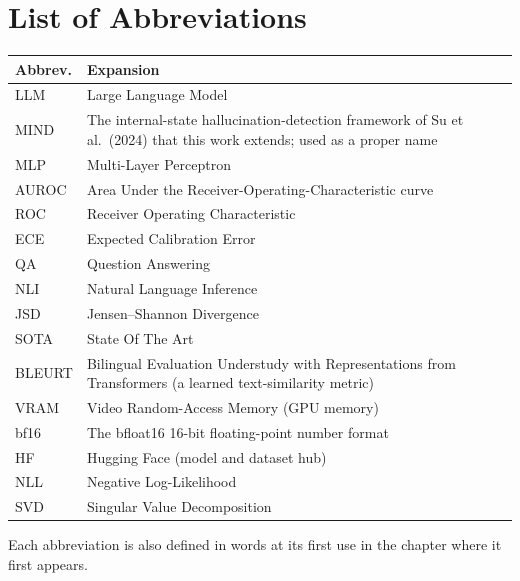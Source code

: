 \clearpage
\chapter*{List of Abbreviations}

\begin{center}
\renewcommand{\arraystretch}{1.25}
\begin{tabular}{p{2.6cm} p{10.5cm}}
\toprule
\textbf{Abbrev.} & \textbf{Expansion} \\
\midrule
LLM     & Large Language Model \\
MIND    & The internal-state hallucination-detection framework of Su et al.~(2024) that this work extends; used as a proper name \\
MLP     & Multi-Layer Perceptron \\
AUROC   & Area Under the Receiver-Operating-Characteristic curve \\
ROC     & Receiver Operating Characteristic \\
ECE     & Expected Calibration Error \\
QA      & Question Answering \\
NLI     & Natural Language Inference \\
JSD     & Jensen--Shannon Divergence \\
SOTA    & State Of The Art \\
BLEURT  & Bilingual Evaluation Understudy with Representations from Transformers (a learned text-similarity metric) \\
VRAM    & Video Random-Access Memory (GPU memory) \\
bf16    & The bfloat16 16-bit floating-point number format \\
HF      & Hugging Face (model and dataset hub) \\
NLL     & Negative Log-Likelihood \\
SVD     & Singular Value Decomposition \\
\bottomrule
\end{tabular}
\end{center}

\noindent\small Each abbreviation is also defined in words at its first use in the
chapter where it first appears.
